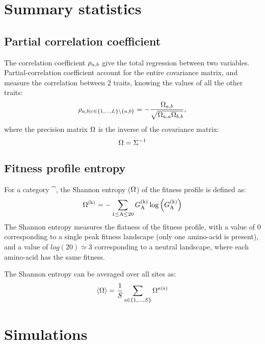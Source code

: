 \section{Summary statistics}

\subsection{Partial correlation coefficient}

The correlation coefficient $\rho_{a, b}$ give the total regression between two variables.
Partial-correlation coefficient account for the entire covariance matrix, and measure the correlation between $2$ traits, knowing the values of all the other traits:
\begin{equation}
    \rho_{a, b | c \in \{1, \hdots, L\} \setminus \{ a, b\} } = - \dfrac{\Omega_{a, b}}{\sqrt{\Omega_{a, a} \Omega_{b, b}}},
\end{equation}
where the precision matrix $\Omega$ is the inverse of the covariance matrix:
\begin{equation}
    \Omega = \Sigma^{-1}
\end{equation}

\subsection{Fitness profile entropy}
For a category $\cat$, the Shannon entropy (${\Omega}$) of the fitness profile is defined as:
\begin{equation}
    {\Omega}^{(\text{k})} = - \sum\limits_{1 \leq \text{A} \leq 20} G^{(\text{k})}_{\text{A}} \log \left( G^{(\text{k})}_{\text{A}} \right)
\end{equation}
The Shannon entropy measures the flatness of the fitness profile, with a value of $0$ corresponding to a single peak fitness landscape (only one amino-acid is present), and a value of $log(20)\simeq3$ corresponding to a \gls{neutral} landscape, where each amino-acid has the same fitness.

The Shannon entropy can be averaged over all sites as:
\begin{equation}
    \langle {\Omega} \rangle = \dfrac{1}{S}\sum\limits_{\text{s} \in \{1, \hdots, S\}} {\Omega}^{\kappa\left(\text{s}\right)}
\end{equation}


\section{Simulations}

